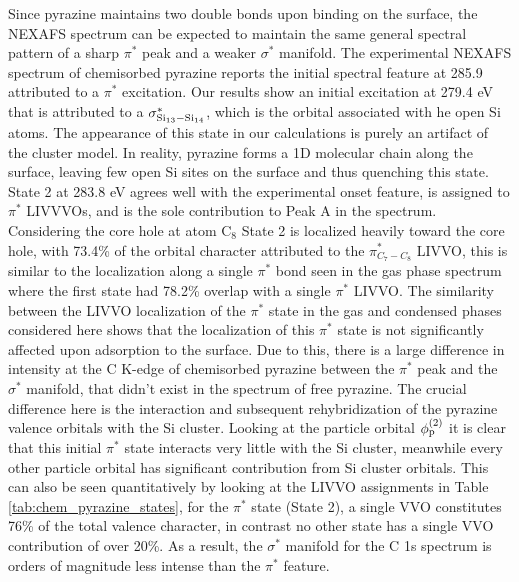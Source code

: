 \documentclass{article}
\begin{document}
Since pyrazine maintains two double bonds upon binding on the surface, the NEXAFS spectrum can be expected to maintain the same general spectral pattern of a sharp $\pi^*$ peak and a weaker $\sigma^*$ manifold. The experimental NEXAFS spectrum of chemisorbed pyrazine reports the initial spectral feature at 285.9 attributed to a $\pi^*$ excitation. Our results show an initial excitation at 279.4 eV that is attributed to a $\sigma^*_{\rm Si_{13}-Si_{14}}$, which is the orbital associated with he open Si atoms. The appearance of this state in our calculations is purely an artifact of the cluster model. In reality, pyrazine forms a 1D molecular chain along the surface, leaving few open Si sites on the surface and thus quenching this state. State 2 at 283.8 eV agrees well with the experimental onset feature, is assigned to $\pi^*$ LIVVVOs, and is the sole contribution to Peak A in the spectrum. Considering the core hole at atom C$_8$ State 2 is localized heavily toward the core hole, with 73.4\% of the orbital character attributed to the $\pi^*_{C_7-C_8}$ LIVVO, this is similar to the localization along a single $\pi^*$ bond seen in the gas phase spectrum where the first state had 78.2\% overlap with a single $\pi^*$ LIVVO. The similarity between the LIVVO localization of the $\pi^*$ state in the gas and condensed phases considered here shows that the localization of this $\pi^*$ state is not significantly affected upon adsorption to the surface. Due to this, there is a large difference in intensity at the C K-edge of chemisorbed pyrazine between the $\pi^*$ peak and the $\sigma^*$ manifold, that didn't exist in the spectrum of free pyrazine. The crucial difference here is the interaction and subsequent rehybridization of the pyrazine valence orbitals with the Si cluster. Looking at the particle orbital $\phi^{(2)}_{\rm p}$ it is clear that this initial $\pi^*$ state interacts very little with the Si cluster, meanwhile every other particle orbital has significant contribution from Si cluster orbitals. This can also be seen quantitatively by looking at the LIVVO assignments in Table \ref{tab:chem_pyrazine_states}, for the $\pi^*$ state (State 2), a single VVO constitutes 76\% of the total valence character, in contrast no other state has a single VVO contribution of over 20\%. As a result, the $\sigma^*$ manifold for the C 1s spectrum is orders of magnitude less intense than the $\pi^*$ feature. 
\end{document}

